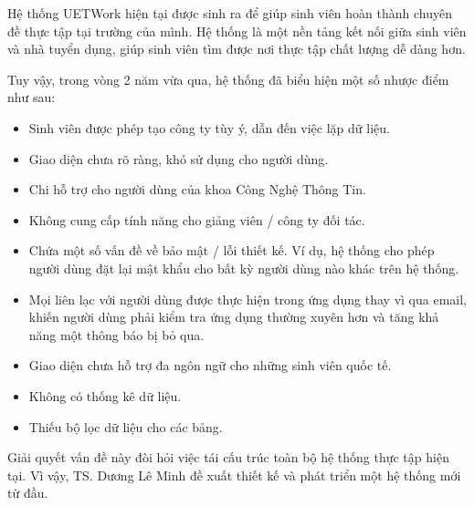 \documentclass[./../main.tex]{subfiles}
\begin{document}
Hệ thống UETWork hiện tại được sinh ra để giúp sinh viên hoàn thành
chuyên đề thực tập tại trường của mình. Hệ thống là một nền tảng kết nối
giữa sinh viên và nhà tuyển dụng, giúp sinh viên tìm được nơi thực tập
chất lượng dễ dàng hơn.

Tuy vậy, trong vòng 2 năm vừa qua, hệ thống đã biểu hiện một số nhược
điểm như sau:

\begin{itemize}
\item
  
  Sinh viên được phép tạo công ty tùy ý, dẫn đến việc lặp dữ liệu.
  
\item
  
  Giao diện chưa rõ ràng, khó sử dụng cho người dùng.
  
\item
  
  Chi hỗ trợ cho người dùng của khoa Công Nghệ Thông Tin.
  
\item
  
  Không cung cấp tính năng cho giảng viên / công ty đối tác.
  
\item
  
  Chứa một số vấn đề về bảo mật / lỗi thiết kế. Ví dụ, hệ thống cho phép
  người dùng đặt lại mật khẩu cho bất kỳ người dùng nào khác trên hệ
  thống.
  
\item
  
  Mọi liên lạc với người dùng được thực hiện trong ứng dụng thay vì qua
  email, khiến người dùng phải kiểm tra ứng dụng thường xuyên hơn và
  tăng khả năng một thông báo bị bỏ qua.
  
\item
  
  Giao diện chưa hỗ trợ đa ngôn ngữ cho những sinh viên quốc tế.
  
\item
  
  Không có thống kê dữ liệu.
  
\item
  
  Thiếu bộ lọc dữ liệu cho các bảng.
  
\end{itemize}

Giải quyết vấn đề này đòi hỏi việc tái cấu trúc toàn bộ hệ thống thực
tập hiện tại. Vì vậy, TS. Dương Lê Minh đề xuất thiết kế và phát triển
một hệ thống mới từ đầu.
\end{document}
